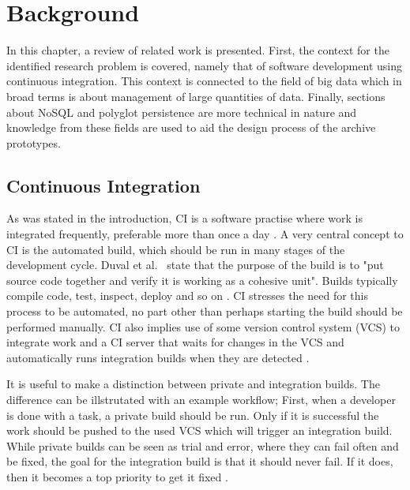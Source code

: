 \chapter{Background}
\label{chap:background}

In this chapter, a review of related work is presented. First, the context for the identified research problem is covered, namely that of software development using continuous integration. This context is connected to the field of big data which in broad terms is about management of large quantities of data. Finally, sections about NoSQL and polyglot persistence are more technical in nature and knowledge from these fields are used to aid the design process of the archive prototypes.


\section{Continuous Integration}
As was stated in the introduction, CI is a software practise where work is integrated frequently, preferable more than once a day \cite{FowlerCI}. A very central concept to CI is the automated build, which should be run in many stages of the development cycle. Duval et al.\ \cite{CIbook} state that the purpose of the build is to "put source code together and verify it is working as a cohesive unit". Builds typically compile code, test, inspect, deploy and so on \cite{CIbook}. CI stresses the need for this process to be automated, no part other than perhaps starting the build should be performed manually. CI also implies use of some version control system (VCS) to integrate work and a CI server that waits for changes in the VCS and automatically runs integration builds when they are detected \cite{FowlerCI}.

It is useful to make a distinction between private and integration builds. The difference can be illstrutated with an example workflow;
First, when a developer is done with a task, a private build should be run. Only if it is successful the work should be pushed to the used VCS which will trigger an integration build. While private builds can be seen as trial and error, where they can fail often and be fixed, the goal for the integration build is that it should never fail. If it does, then it becomes a top priority to get it fixed \cite{FowlerCI}.

